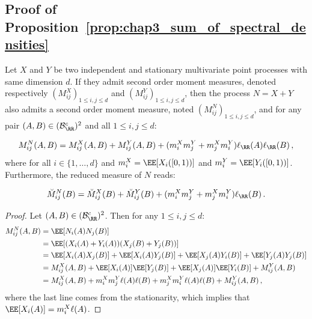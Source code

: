 \begin{subappendices}

    \section{Proof of Proposition~\ref{prop:chap3_sum_of_spectral_densities}}\label{appendix:chap3_proof_sum_spectra}
          
    \begin{lemma}\label{lemma:sum_second_order_moment}
      Let $X$ and $Y$ be two independent and stationary multivariate point processes with same dimension $d$.
      If they admit second order moment measures, denoted respectively $(M_{ij}^{X})_{1 \le i, j \le d}$ and $(M_{ij}^{Y})_{1 \le i, j \le d}$,
      then the process $N = X + Y$ also admits a second order moment measure,
      noted $(M_{ij}^N)_{1 \le i, j \le d}$,
      and for any pair $(A, B) \in (\mathcal{B}_{\RR}^c)^2$ and all $1 \le i, j \le d$:
      
      \begin{equation}\label{eq:chap3_relation_second_moment}
          M_{ij}^N(A, B) = M_{ij}^{X}(A, B) + M_{ij}^{Y}(A, B) + (m_i^X m_j^Y + m_j^X m_i^Y)\ell_\RR(A)\ell_\RR(B)\,,
      \end{equation}
      where for all $i \in \{1, \dots, d\}$ and $m_i^X = \EE[X_i([0, 1))]$ and $m_i^Y = \EE[Y_i([0, 1))]$.
      Furthermore, the reduced measure of $N$ reads:

          \begin{equation}\label{eq:chap3_relation_reduced_moment}
          \breve M_{ij}^N(B) = \breve M_{ij}^X(B) + \breve M_{ij}^Y(B)+ (m_i^X m_j^Y + m_j^X m_i^Y)\ell_{\RR}(B)\,.
      \end{equation}
     
    \end{lemma}

    \begin{proof}

    Let $(A,B)\in (\mathcal{B}_{\RR}^c)^2$. Then for any $1 \leq i,j \leq d$:
  \begin{align*}
      M_{ij}^N(A, B) &= \EE[N_i(A)N_j(B)] \\
      &= \EE[(X_i(A) + Y_i(A))(X_j(B) + Y_j(B))]\\
      &= \EE[X_i(A)X_j(B)] + \EE[X_i(A)Y_j(B)] + \EE[X_j(A)Y_i(B)] + \EE[Y_j(A)Y_j(B)]\\
      &= M_{ij}^X(A,B) + \EE[X_i(A)]\EE[Y_j(B)] + \EE[X_j(A)]\EE[Y_i(B)] + M_{ij}^Y(A,B)\\
      &= M_{ij}^X(A,B) + m_i^X m_j^Y\ell(A)\ell(B) + m_j^X m_i^Y\ell(A)\ell(B) + M_{ij}^Y(A,B)\,,
  \end{align*}
  where the last line comes from the stationarity, which implies that $\EE[X_i(A)] = m_i^X \ell(A)$.
   

\end{proof}
\end{subappendices}
